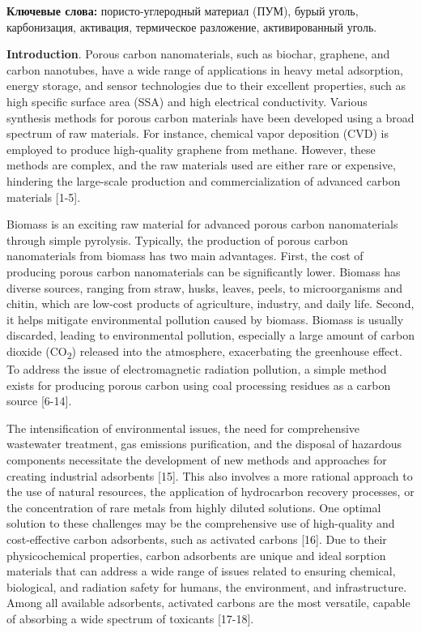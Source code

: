 {\bfseries Ключевые слова:} пористо-углеродный материал (ПУМ), бурый уголь,
карбонизация, активация, термическое разложение, активированный уголь.

\begin{multicols}{2}
{\bfseries Introduction}. Porous carbon nanomaterials, such as biochar,
graphene, and carbon nanotubes, have a wide range of applications in
heavy metal adsorption, energy storage, and sensor technologies due to
their excellent properties, such as high specific surface area (SSA) and
high electrical conductivity. Various synthesis methods for porous
carbon materials have been developed using a broad spectrum of raw
materials. For instance, chemical vapor deposition (CVD) is employed to
produce high-quality graphene from methane. However, these methods are
complex, and the raw materials used are either rare or expensive,
hindering the large-scale production and commercialization of advanced
carbon materials {[}1-5{]}.

Biomass is an exciting raw material for advanced porous carbon
nanomaterials through simple pyrolysis. Typically, the production of
porous carbon nanomaterials from biomass has two main advantages. First,
the cost of producing porous carbon nanomaterials can be significantly
lower. Biomass has diverse sources, ranging from straw, husks, leaves,
peels, to microorganisms and chitin, which are low-cost products of
agriculture, industry, and daily life. Second, it helps mitigate
environmental pollution caused by biomass. Biomass is usually discarded,
leading to environmental pollution, especially a large amount of carbon
dioxide (CO\textsubscript{2}) released into the atmosphere, exacerbating
the greenhouse effect. To address the issue of electromagnetic radiation
pollution, a simple method exists for producing porous carbon using coal
processing residues as a carbon source {[}6-14{]}.

The intensification of environmental issues, the need for comprehensive
wastewater treatment, gas emissions purification, and the disposal of
hazardous components necessitate the development of new methods and
approaches for creating industrial adsorbents {[}15{]}. This also
involves a more rational approach to the use of natural resources, the
application of hydrocarbon recovery processes, or the concentration of
rare metals from highly diluted solutions. One optimal solution to these
challenges may be the comprehensive use of high-quality and
cost-effective carbon adsorbents, such as activated carbons {[}16{]}.
Due to their physicochemical properties, carbon adsorbents are unique
and ideal sorption materials that can address a wide range of issues
related to ensuring chemical, biological, and radiation safety for
humans, the environment, and infrastructure. Among all available
adsorbents, activated carbons are the most versatile, capable of
absorbing a wide spectrum of toxicants {[}17-18{]}.


\end{multicols}
